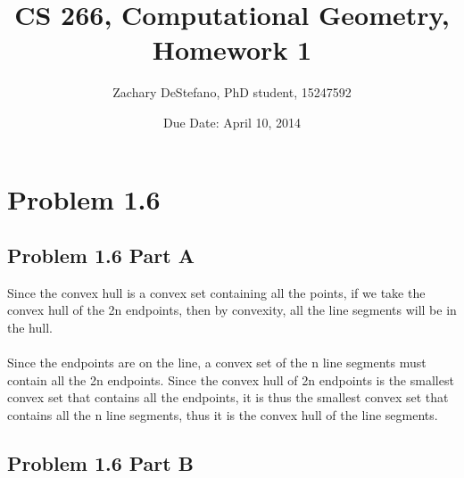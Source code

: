 \documentclass[11pt,psfig]{article}
\begin{document}
\setlength{\parskip}{1.2ex plus0.3ex minus 0.3ex}


\thispagestyle{empty} \pagestyle{myheadings} 



\title{CS 266, Computational Geometry, Homework 1}
\author{Zachary DeStefano, PhD student, 15247592}
\date{Due Date: April 10, 2014}

\maketitle

\vfill\eject

\section*{Problem 1.6}

\subsection*{Problem 1.6 Part A}

Since the convex hull is a convex set containing all the points, if we take the convex hull of the 2n endpoints, then by convexity, all the line segments will be in the hull. 
\\
\\
Since the endpoints are on the line, a convex set of the n line segments must contain all the 2n endpoints. Since the convex hull of 2n endpoints is the smallest convex set that contains all the endpoints, it is thus the smallest convex set that contains all the n line segments, thus it is the convex hull of the line segments. 

\subsection*{Problem 1.6 Part B}
\end{document}
